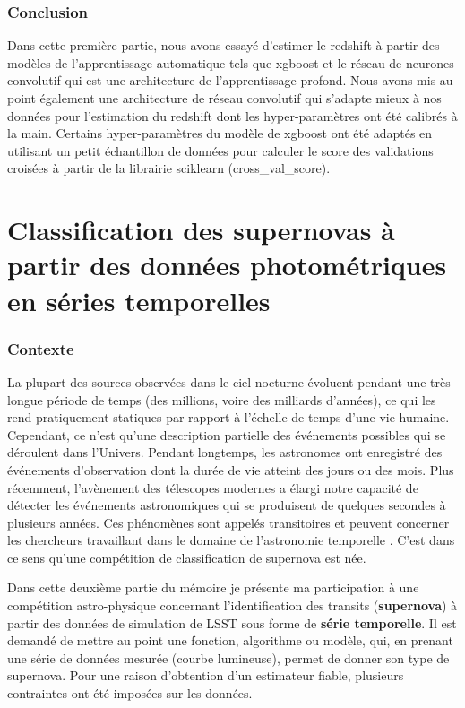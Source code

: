 \documentclass[french]{report}
\begin{document}
\section*{Conclusion}
Dans cette première partie, nous avons essayé d'estimer le redshift à partir des modèles de l'apprentissage automatique tels que xgboost et le réseau de neurones convolutif qui est une architecture de l'apprentissage profond. Nous avons mis au point également une architecture de réseau convolutif qui s'adapte mieux à nos données pour l'estimation du redshift dont les hyper-paramètres ont été calibrés à la main. Certains hyper-paramètres du modèle de xgboost ont été adaptés en utilisant un petit échantillon de données pour calculer le score des validations croisées à partir de la librairie sciklearn (cross\_val\_score).  

\part{Classification des supernovas à partir des données photométriques en séries temporelles}
\section*{Contexte}
La plupart des sources observées dans le ciel nocturne évoluent pendant une très longue période de temps (des millions, voire des milliards d'années), ce qui les rend pratiquement statiques par rapport à l'échelle de temps d'une vie humaine. Cependant, ce n'est qu'une description partielle des événements possibles qui se déroulent dans l'Univers. Pendant longtemps, les astronomes ont enregistré des événements d'observation dont la durée de vie atteint des jours ou des mois. Plus récemment, l'avènement des télescopes modernes a élargi \cite{lsst} notre capacité de détecter les événements astronomiques qui se produisent de quelques secondes à plusieurs années. Ces phénomènes sont appelés transitoires et peuvent concerner les chercheurs travaillant dans le domaine de l'astronomie temporelle \cite{ramps}. C'est dans ce sens qu'une compétition de classification de supernova est née.

Dans cette deuxième partie du mémoire je présente ma participation à une compétition astro-physique concernant l'identification des transits (\textbf{supernova}) à partir des données de simulation de LSST sous forme de \textbf{série temporelle}. Il est demandé de mettre au point une fonction, algorithme ou modèle, qui, en prenant une série de données mesurée (courbe lumineuse), permet de donner son type de supernova. Pour une raison d'obtention d'un estimateur fiable, plusieurs contraintes ont été imposées sur les données. 
\end{document}
